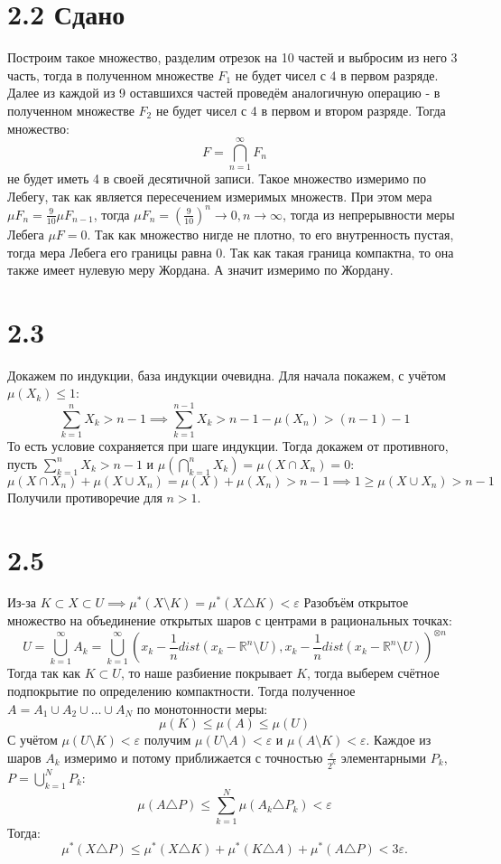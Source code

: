 \documentclass[12pt]{article}
\begin{document}
\section{2.2 Сдано}
Построим такое множество, разделим отрезок на 10 частей и выбросим из него 3 часть, тогда в полученном 
множестве $F_1$ не будет чисел с 4 в первом разряде. Далее из каждой из 9 оставшихся частей проведём аналогичную операцию - 
в полученном множестве $F_2$ не будет чисел с 4 в первом и втором разряде. Тогда множество:
\[
    F = \bigcap_{n=1}^{\infty} F_n
\]  
не будет иметь 4 в своей десятичной записи. Такое множество измеримо по Лебегу, так как является 
пересечением измеримых множеств. При этом мера $\mu F_n = \frac{9}{10} \mu F_{n-1}$, тогда 
$\mu F_n = \left( \frac{9}{10} \right)^n \to 0, n \to \infty$, тогда из непрерывности меры Лебега 
$\mu F = 0$. Так как множество нигде не плотно, то его внутренность пустая, тогда мера Лебега его 
границы равна $0$. Так как такая граница компактна, то она также имеет нулевую меру Жордана. А значит измеримо по 
Жордану. 
\section{2.3}
Докажем по индукции, база индукции очевидна. Для начала покажем, с учётом $\mu(X_k) \leq 1$: 
\[
    \sum_{k=1}^{n} X_k > n - 1 \implies \sum_{k=1}^{n - 1} X_k > n - 1 - \mu(X_n) > (n - 1) - 1
\]
То есть условие сохраняется при шаге индукции. Тогда докажем от противного, пусть $\sum_{k=1}^{n} X_k > n - 1$
и $\mu \left( \bigcap_{k=1}^{n} X_k \right)  = \mu (X \cap X_n) = 0$: 
\[
    \mu(X \cap X_n) + \mu(X \cup X_n) = \mu(X) + \mu(X_n) > n - 1 \implies 1 \geq \mu(X \cup X_n) > n - 1  
\]     
Получили противоречие для $n > 1$. 


\section{2.5}
Из-за $K \subset X \subset U \implies \mu^{\ast} (X \setminus K) = \mu^{\ast} (X \triangle K) < \varepsilon$ 
Разобъём открытое множество на объединение открытых шаров с центрами в рациональных точках: 
\[
    U = \bigcup_{k=1}^{\infty} A_k =  \bigcup_{k=1}^{\infty} (x_k - \frac{1}{n} dist(x_k - \mathbb{R}^n \setminus U), x_k - \frac{1}{n} dist(x_k - \mathbb{R}^n \setminus U))^{\otimes n}
\]
Тогда так как $K \subset U$, то наше разбиение покрывает $K$, тогда выберем счётное подпокрытие по определению 
компактности. Тогда полученное $A = A_1 \cup A_2 \cup \dots \cup A_N$ по монотонности меры: 
\[
    \mu(K) \leq \mu(A) \leq \mu(U)
\]
С учётом $\mu(U \setminus K) < \varepsilon$ получим $\mu(U \setminus A) < \varepsilon$ и $\mu(A \setminus K) < \varepsilon$. 
Каждое из шаров $A_k$ измеримо и потому приближается с точностью $\frac{\varepsilon}{2^k}$ элементарными $P_k$, $P = \bigcup_{k=1}^{N} P_k$: 
\[
    \mu(A \triangle P) \leq \sum_{k=1}^{N} \mu(A_k \triangle P_k) < \varepsilon
\]
Тогда: 
\[
    \mu^{\ast} (X \triangle P) \leq \mu^{\ast} (X \triangle K) + \mu^{\ast} (K \triangle A) + \mu^{\ast} (A \triangle P) < 3 \varepsilon.
\]
\end{document}
